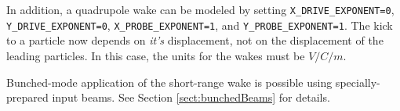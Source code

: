 In addition, a quadrupole wake can be modeled by setting {\tt X\_DRIVE\_EXPONENT=0}, {\tt
Y\_DRIVE\_EXPONENT=0}, {\tt X\_PROBE\_EXPONENT=1}, and {\tt Y\_PROBE\_EXPONENT=1}.
The kick to a particle now depends on {\em it's} displacement, not on the displacement of
the leading particles.
In this case, the units for the wakes must be $V/C/m$.

Bunched-mode application of the short-range wake is possible using specially-prepared input
beams. 
See Section \ref{sect:bunchedBeams} for details.
